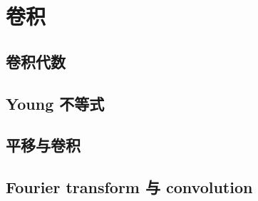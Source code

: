 \section{卷积}
\label{b2:sec:0303}


\subsection{卷积代数}
\label{b2:subsec:030301}

\subsection{Young 不等式}
\label{b2:subsec:030302}

\subsection{平移与卷积}
\label{b2:subsec:030303}

\subsection{Fourier transform 与 convolution}
\label{b2:subsec:030304}



